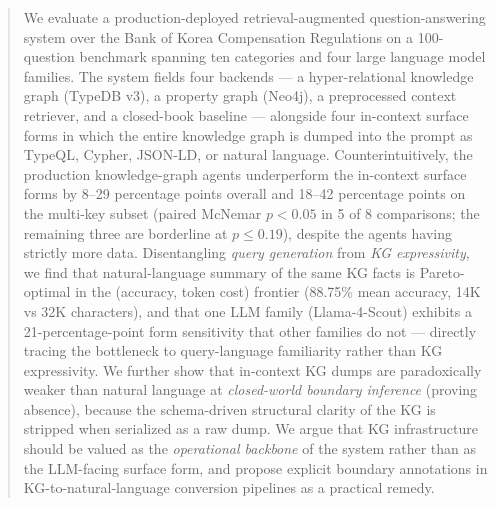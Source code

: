 \begin{abstract}
We evaluate a production-deployed retrieval-augmented question-answering
system over the Bank of Korea Compensation Regulations on a 100-question
benchmark spanning ten categories and four large language model
families. The system fields four backends — a hyper-relational
knowledge graph (TypeDB v3), a property graph (Neo4j), a preprocessed
context retriever, and a closed-book baseline — alongside four
in-context surface forms in which the entire knowledge graph is dumped
into the prompt as TypeQL, Cypher, JSON-LD, or natural language.
Counterintuitively, the production knowledge-graph agents underperform
the in-context surface forms by 8--29 percentage points overall and
18--42 percentage points on the multi-key subset (paired McNemar
$p<0.05$ in 5 of 8 comparisons; the remaining three are borderline at
$p\le 0.19$), despite the agents having strictly more data. Disentangling \emph{query generation}
from \emph{KG expressivity}, we find that natural-language summary of
the same KG facts is Pareto-optimal in the (accuracy, token cost)
frontier (88.75\% mean accuracy, 14K vs 32K characters), and that one
LLM family (Llama-4-Scout) exhibits a 21-percentage-point form
sensitivity that other families do not — directly tracing the bottleneck
to query-language familiarity rather than KG expressivity. We further
show that in-context KG dumps are paradoxically weaker than natural
language at \emph{closed-world boundary inference} (proving absence),
because the schema-driven structural clarity of the KG is stripped when
serialized as a raw dump. We argue that KG infrastructure should be
valued as the \emph{operational backbone} of the system rather than as
the LLM-facing surface form, and propose explicit boundary annotations
in KG-to-natural-language conversion pipelines as a practical remedy.
\end{abstract}
